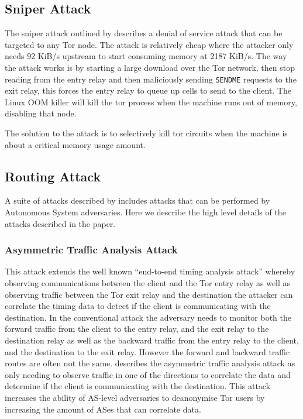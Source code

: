 \documentclass[9pt,technote]{IEEEtran}
\begin{document}
\subsection{Sniper Attack}
The sniper attack outlined by \citeauthor{jansen2014sniper} describes a denial
of service attack that can be targeted to any Tor node. The attack is relatively cheap where the attacker only needs 92 KiB/s upstream to start consuming memory at 2187 KiB/s. The way the attack works is by starting a large download over the Tor network, then stop reading from the entry relay and then maliciously sending \texttt{SENDME} requests to the exit relay, this forces the entry relay to queue up cells to send to the client. The Linux OOM killer will kill the tor process when the machine runs out of memory, disabling that node.

The solution to the attack is to selectively kill tor circuits when the machine
is about a critical memory usage amount.

\subsection{Routing Attack}
A suite of attacks described by \citeauthor{sun2015raptor} includes attacks that
can be performed by Autonomous System adversaries. Here we describe the high
level details of the attacks described in the paper.
\subsubsection{Asymmetric Traffic Analysis Attack}
This attack extends the well known ``end-to-end timing analysis attack'' whereby
observing communications between the client and the Tor entry relay as well as
observing traffic between the Tor exit relay and the destination the attacker
can correlate the timing data to detect if the client is communicating with the
destination. In the conventional attack the adversary needs to monitor both the
forward traffic from the client to the entry relay, and the exit relay to the
destination relay as well as the backward traffic from the entry relay to the
client, and the destination to the exit relay. However the forward and backward
traffic routes are often not the same. \citeauthor{sun2015raptor} describes the
asymmetric traffic analysis attack as only needing to observe traffic in one of
the directions to correlate the data and determine if the client is
communicating with the destination. This attack increases the ability of
AS-level adversaries to deanonymise Tor users by increasing the amount of ASes
that can correlate data.
\end{document}
